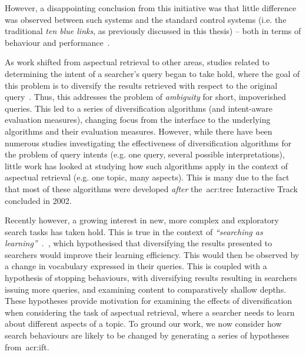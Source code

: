 However, a disappointing conclusion from this initiative was that little difference was observed between such systems and the standard control systems (i.e. the traditional \emph{ten blue links}, as previously discussed in this thesis) -- both in terms of behaviour and performance~\citep{voorhees2005trec_book}.

As work shifted from aspectual retrieval to other areas, studies related to determining the intent of a searcher's query began to take hold, where the goal of this problem is to diversify the results retrieved with respect to the original query~\citep{rose2004understanding_user_goals}. Thus, this addresses the problem of \emph{ambiguity} for short, impoverished queries. This led to a series of diversification algorithms (and intent-aware evaluation measures), changing focus from the interface to the underlying algorithms and their evaluation measures. However, while there have been numerous studies investigating the effectiveness of diversification algorithms for the problem of query intents (e.g. one query, several possible interpretations), little work has looked at studying how such algorithms apply in the context of aspectual retrieval (e.g. one topic, many aspects). This is many due to the fact that most of these algorithms were developed \emph{after} the~\gls{acr:trec} Interactive Track concluded in 2002.

Recently however, a growing interest in new, more complex and exploratory search tasks has taken hold. This is true in the context of \emph{``searching as learning''}~\citep{collins2017sal}.~\cite{syed2017sal}, which hypothesised that diversifying the results presented to searchers would improve their learning efficiency. This would then be observed by a change in vocabulary expressed in their queries. This is coupled with a hypothesis of stopping behaviours, with diversifying results resulting in searchers issuing more queries, and examining content to comparatively shallow depths. These hypotheses provide motivation for examining the effects of diversification when considering the task of aspectual retrieval, where a searcher needs to learn about different aspects of a topic. To ground our work, we now consider how search behaviours are likely to be changed by generating a series of hypotheses from~\gls{acr:ift}.

